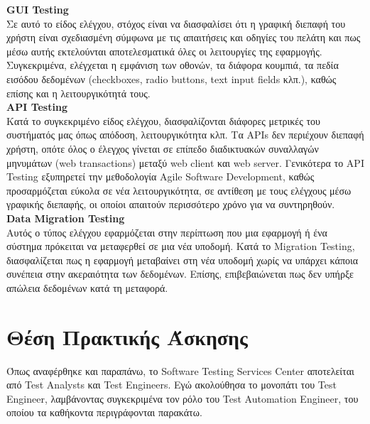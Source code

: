 \textbf{GUI Testing}\\
Σε αυτό το είδος ελέγχου, στόχος είναι να διασφαλίσει ότι η γραφική διεπαφή του χρήστη είναι σχεδιασμένη σύμφωνα με τις απαιτήσεις και οδηγίες του πελάτη και πως μέσω αυτής εκτελούνται αποτελεσματικά όλες οι λειτουργίες της εφαρμογής. Συγκεκριμένα, ελέγχεται η εμφάνιση των οθονών, τα διάφορα κουμπιά, τα πεδία εισόδου δεδομένων (checkboxes, radio buttons, text input fields κλπ.), καθώς επίσης και η λειτουργικότητά τους.\\

\textbf{API Testing}\\
Κατά το συγκεκριμένο είδος ελέγχου, διασφαλίζονται διάφορες μετρικές του συστήματός μας όπως απόδοση, λειτουργικότητα κλπ. Τα APIs δεν περιέχουν διεπαφή χρήστη, οπότε όλος ο έλεγχος γίνεται σε επίπεδο διαδικτυακών συναλλαγών μηνυμάτων (web transactions) μεταξύ web client και web server. Γενικότερα το API Testing εξυπηρετεί την μεθοδολογία Agile Software Development, καθώς προσαρμόζεται εύκολα σε νέα λειτουργικότητα, σε αντίθεση με τους ελέγχους μέσω γραφικής διεπαφής, οι οποίοι απαιτούν περισσότερο χρόνο για να συντηρηθούν.\\

\textbf{Data Migration Testing}\\
Αυτός ο τύπος ελέγχου εφαρμόζεται στην περίπτωση που μια εφαρμογή ή ένα σύστημα πρόκειται να μεταφερθεί σε μια νέα υποδομή. Κατά το Migration Testing, διασφαλίζεται πως η εφαρμογή μεταβαίνει στη νέα υποδομή χωρίς να υπάρχει κάποια συνέπεια στην ακεραιότητα των δεδομένων. Επίσης, επιβεβαιώνεται πως δεν υπήρξε απώλεια δεδομένων κατά τη μεταφορά.\\

\section*{Θέση Πρακτικής Άσκησης}
Όπως αναφέρθηκε και παραπάνω, το Software Testing Services Center αποτελείται από Test Analysts και Test Engineers. Εγώ ακολούθησα το μονοπάτι του Test Engineer, λαμβάνοντας συγκεκριμένα τον ρόλο του Test Automation Engineer, του οποίου τα καθήκοντα περιγράφονται παρακάτω.\\

